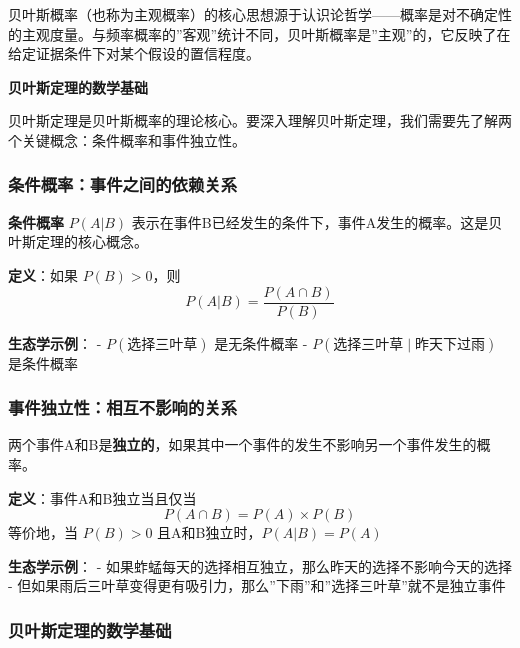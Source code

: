 \documentclass[
]{book}
\begin{document}
贝叶斯概率（也称为主观概率）的核心思想源于认识论哲学------概率是对不确定性的主观度量。与频率概率的''客观''统计不同，贝叶斯概率是''主观''的，它反映了在给定证据条件下对某个假设的置信程度。

\textbf{贝叶斯定理的数学基础}

贝叶斯定理是贝叶斯概率的理论核心。要深入理解贝叶斯定理，我们需要先了解两个关键概念：条件概率和事件独立性。

\hypertarget{ux6761ux4ef6ux6982ux7387ux4e8bux4ef6ux4e4bux95f4ux7684ux4f9dux8d56ux5173ux7cfb}{%
\subsubsection{条件概率：事件之间的依赖关系}\label{ux6761ux4ef6ux6982ux7387ux4e8bux4ef6ux4e4bux95f4ux7684ux4f9dux8d56ux5173ux7cfb}}

\textbf{条件概率} \(P(A|B)\) 表示在事件B已经发生的条件下，事件A发生的概率。这是贝叶斯定理的核心概念。

\textbf{定义}：如果 \(P(B) > 0\)，则
\[P(A|B) = \frac{P(A \cap B)}{P(B)}\]

\textbf{生态学示例}：
- \(P(\text{选择三叶草})\) 是无条件概率
- \(P(\text{选择三叶草} \mid \text{昨天下过雨})\) 是条件概率

\hypertarget{ux4e8bux4ef6ux72ecux7acbux6027ux76f8ux4e92ux4e0dux5f71ux54cdux7684ux5173ux7cfb}{%
\subsubsection{事件独立性：相互不影响的关系}\label{ux4e8bux4ef6ux72ecux7acbux6027ux76f8ux4e92ux4e0dux5f71ux54cdux7684ux5173ux7cfb}}

两个事件A和B是\textbf{独立的}，如果其中一个事件的发生不影响另一个事件发生的概率。

\textbf{定义}：事件A和B独立当且仅当
\[P(A \cap B) = P(A) \times P(B)\]
等价地，当 \(P(B) > 0\) 且A和B独立时，\(P(A|B) = P(A)\)

\textbf{生态学示例}：
- 如果蚱蜢每天的选择相互独立，那么昨天的选择不影响今天的选择
- 但如果雨后三叶草变得更有吸引力，那么''下雨''和''选择三叶草''就不是独立事件

\hypertarget{ux8d1dux53f6ux65afux5b9aux7406ux7684ux6570ux5b66ux57faux7840}{%
\subsubsection{贝叶斯定理的数学基础}\label{ux8d1dux53f6ux65afux5b9aux7406ux7684ux6570ux5b66ux57faux7840}}
\end{document}
